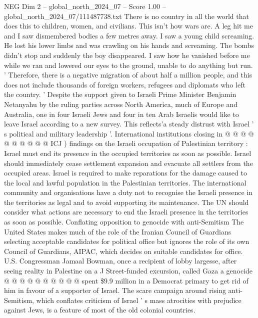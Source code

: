 \begin{textsample}{NEG Dim 2 – global\_north\_2024\_07 – Score 1.00 – global\_north\_2024\_07/111487738.txt}  \label{ex:f2_neg_256}
There is no country in all the world that does this to children, women, and civilians.
This isn't how wars are.
A leg hit me and I saw dismembered bodies a few metres away.
I saw a young child screaming.
He lost his lower limbs and was crawling on his hands and screaming.
The bombs didn't stop and suddenly the boy disappeared.
I saw how he vanished before me while we ran and lowered our eyes to the ground, unable to do anything but run. ' Therefore, there is a negative migration of about half a million people, and this does not include thousands of foreign workers, refugees and diplomats who left the country. ' Despite the support given to Israeli Prime Minister Benjamin Netanyahu by the ruling parties across North America, much of Europe and Australia, one in four Israeli Jews and four in ten Arab Israelis would like to leave Israel according to a new survey.
This reflects'a steady distrust with Israel ' s political and military leadership '.
International institutions closing in @ @ @ @ @ @ @ @ @ @ ICJ ) findings on the Israeli occupation of Palestinian territory : Israel must end its presence in the occupied territories as soon as possible.
Israel should immediately cease settlement expansion and evacuate all settlers from the occupied areas.
Israel is required to make reparations for the damage caused to the local and lawful population in the Palestinian territories.
The international community and organisations have a duty not to recognise the Israeli presence in the territories as legal and to avoid supporting its maintenance.
The UN should consider what actions are necessary to end the Israeli presence in the territories as soon as possible.
Conflating opposition to genocide with anti-Semitism The United States makes much of the role of the Iranian Council of Guardians selecting acceptable candidates for political office but ignores the role of its own Council of Guardians, AIPAC, which decides on suitable candidates for office.
U.S.
Congressman Jamaal Bowman, once a recipient of lobby largesse, after seeing reality in Palestine on a J Street-funded excursion, called Gaza a genocide @ @ @ @ @ @ @ @ @ @ spent \$9.9 million in a Democrat primary to get rid of him in favour of a supporter of Israel.
The scare campaign around rising anti-Semitism, which conflates criticism of Israel ' s mass atrocities with prejudice against Jews, is a feature of most of the old colonial countries.

\end{textsample}
